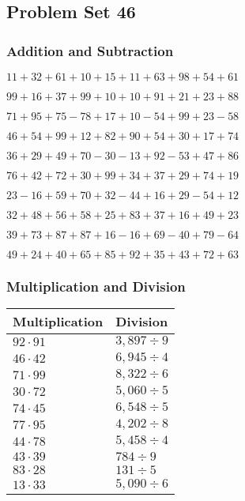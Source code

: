 \hypertarget{problem-set-46}{%
\subsection{Problem Set 46}\label{problem-set-46}}

\hypertarget{addition-and-subtraction}{%
\subsubsection{Addition and
Subtraction}\label{addition-and-subtraction}}

\(11+32+61+10+15+11+63+98+54+61\)

\(99+16+37+99+10+10+91+21+23+88\)

\(71+95+75-78+17+10-54+99+23-58\)

\(46+54+99+12+82+90+54+30+17+74\)

\(36+29+49+70-30-13+92-53+47+86\)

\(76+42+72+30+99+34+37+29+74+19\)

\(23-16+59+70+32-44+16+29-54+12\)

\(32+48+56+58+25+83+37+16+49+23\)

\(39+73+87+87+16-16+69-40+79-64\)

\(49+24+40+65+85+92+35+43+72+63\)

\hypertarget{multiplication-and-division}{%
\subsubsection{Multiplication and
Division}\label{multiplication-and-division}}

\begin{longtable}[]{@{}ll@{}}
\toprule
Multiplication & Division\tabularnewline
\midrule
\endhead
\(92\cdot91\) & \(3,897÷9\)\tabularnewline
\(46\cdot42\) & \(6,945÷4\)\tabularnewline
\(71\cdot99\) & \(8,322÷6\)\tabularnewline
\(30\cdot72\) & \(5,060÷5\)\tabularnewline
\(74\cdot45\) & \(6,548÷5\)\tabularnewline
\(77\cdot95\) & \(4,202÷8\)\tabularnewline
\(44\cdot78\) & \(5,458÷4\)\tabularnewline
\(43\cdot39\) & \(784÷9\)\tabularnewline
\(83\cdot28\) & \(131÷5\)\tabularnewline
\(13\cdot33\) & \(5,090÷6\)\tabularnewline
\bottomrule
\end{longtable}
